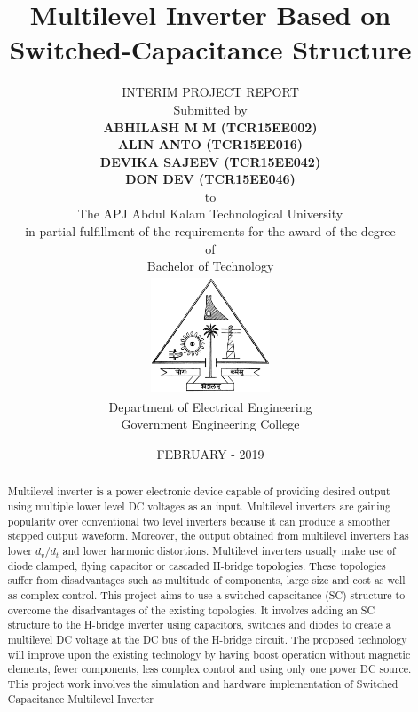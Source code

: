 \documentclass[12pt,a4paper]{report}
\begin{document}
\title{
	\textbf
	{\LARGE{Multilevel Inverter Based on Switched-Capacitance Structure}}\\ 
	}
\author{
	{\Large{INTERIM PROJECT REPORT}} \\
	{\large{Submitted by}}\vspace{.25in}\\	
	{\bf\large ABHILASH M M (TCR15EE002)} \\
	{\bf\large ALIN ANTO (TCR15EE016)} \\
	{\bf\large DEVIKA SAJEEV (TCR15EE042)} \\
	{\bf\large DON DEV (TCR15EE046)}\vspace{0.25in} \\
	to\\
	The APJ Abdul Kalam Technological University\\
	in partial fulfillment of the requirements for the award of the degree\\
	of\\
	Bachelor of Technology\\
	\includegraphics[height=1.4in, width=1.4in]{figures/gectemblem}\\
	Department of Electrical Engineering \\
	Government Engineering College  \\
}
\date{FEBRUARY - 2019}
\maketitle

\begin{abstract}
Multilevel inverter is a power electronic device capable of providing desired output using multiple lower level DC voltages as an input. Multilevel inverters are gaining popularity over conventional two level inverters because it can produce a smoother stepped output waveform. Moreover, the output obtained from multilevel inverters has lower $d_v/d_t$ and lower harmonic distortions. Multilevel inverters usually make use of diode clamped, flying capacitor or cascaded H-bridge topologies. These topologies suffer from disadvantages such as multitude of components, large size and cost as well as complex control. This project aims to use a switched-capacitance (SC) structure to overcome the disadvantages of the existing topologies. It involves adding an SC structure to the H-bridge inverter using capacitors, switches and diodes to create a multilevel DC voltage at the DC bus of the H-bridge circuit. The proposed technology will improve upon the existing technology by having boost operation without magnetic elements, fewer components, less complex control and using only one power DC source. This project work involves the simulation and hardware implementation of Switched Capacitance Multilevel Inverter
\end{abstract}
\end{document}
